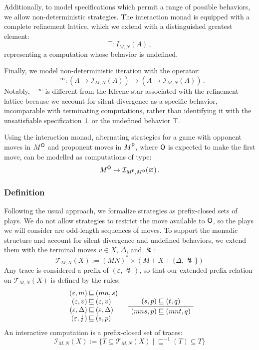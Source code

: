 Additionally,
to model specifications which permit a range of possible behaviors,
we allow non-deterministic strategies.
The interaction monad is equipped with a complete refinement lattice,
which we extend with a distinguished greatest element:
\[
    \top : I_{M,N}(A) \,,
\]
representing a computation whose behavior is undefined.

Finally,
we model non-deterministic iteration with the operator:
\[
     -^\infty : (A \rightarrow \mathcal{I}_{M,N}(A)) \rightarrow
                (A \rightarrow \mathcal{I}_{M,N}(A)) \,.
\]
Notably,
$-^\infty$ is different from
the Kleene star associated with the refinement lattice
because we account for silent divergence as a specific behavior,
incomparable with terminating computations,
rather than identifying it with
the unsatisfiable specification $\bot$
or the undefined behavior $\top$.

Using the interaction monad,
alternating strategies for a game with
opponent moves in $M^{ \mathsf{O} }$ and
proponent moves in $M^{ \mathsf{P} }$,
where $ \mathsf{O} $ is expected to make the first move,
can be modelled as computations of type:
\[
    M^{ \mathsf{O} } \rightarrow
      \mathcal{I}_{M^{ \mathsf{P} }, M^{ \mathsf{O} }}(\varnothing) \,.
\]


\subsubsection{Definition} %

Following the usual approach,
we formalize strategies as prefix-closed sets of plays.
We do not allow strategies to restrict the move available to $ \mathsf{O} $,
so the plays we will consider are odd-length sequences of moves.
To support the monadic structure and account
for silent divergence and undefined behaviors,
we extend them with the
terminal moves $v \in X$, $\Delta$, and $\lightning$:
\[
    \mathcal{T}_{M,N}(X) :=
      (M N)^* \times (M + X + \{\Delta, \lightning\})
\]
Any trace is considered a prefix of $(\varepsilon, \lightning)$,
so that our extended prefix relation on $\mathcal{T}_{M,N}(X)$
is defined by the rules:
\[
  \begin{array}{r@{\:\sqsubseteq\:}l}
    (\varepsilon, m) & (mn, s) \\
    (\varepsilon, v) & (\varepsilon, v) \\
    (\varepsilon, \Delta) & (\varepsilon, \Delta) \\
    (\varepsilon, \lightning) & (s, p)
  \end{array}
  \quad
  \AxiomC{$(s, p) \sqsubseteq (t, q)$}
  \UnaryInfC{$(mns, p) \sqsubseteq (mnt, q)$}
  \DisplayProof
\]
An interactive computation is
a prefix-closed set of traces:
\[
    \mathcal{I}_{M,N}(X) :=
    \{ T \subseteq \mathcal{T}_{M,N}(X) \mid
       {\sqsubseteq}^{-1}(T) \subseteq T \}
\]

